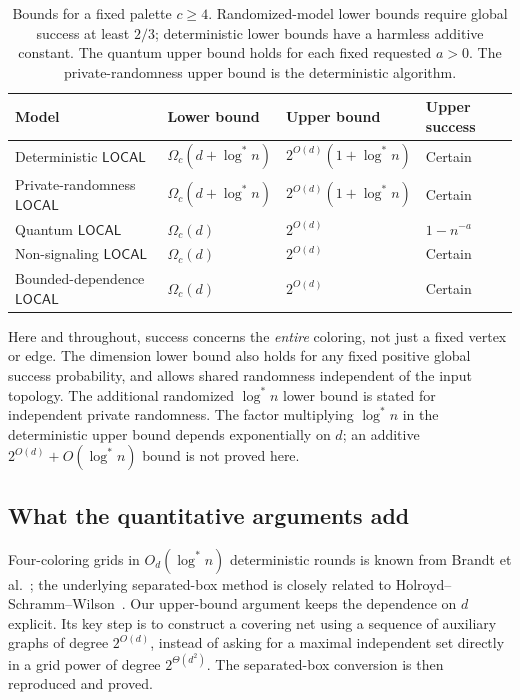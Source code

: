 \documentclass[11pt]{article}
\theoremstyle{definition}\newtheorem{definition}[theorem]{Definition}
\theoremstyle{remark}\newtheorem{remark}[theorem]{Remark}
\newcommand{\LOCAL}{\mathsf{LOCAL}}
\newcommand{\ls}{\log^*}
\begin{document}
\begin{table}[htbp]
\centering\small
\begin{tabularx}{\linewidth}{@{}lXXl@{}}
\toprule
Model & Lower bound & Upper bound & Upper success\\
\midrule
Deterministic $\LOCAL$
 & $\Omega_c(d+\ls n)$ & $2^{O(d)}(1+\ls n)$ & Certain\\
Private-randomness $\LOCAL$
 & $\Omega_c(d+\ls n)$ & $2^{O(d)}(1+\ls n)$ & Certain\\
Quantum $\LOCAL$
 & $\Omega_c(d)$ & $2^{O(d)}$ & $1-n^{-a}$\\
Non-signaling $\LOCAL$
 & $\Omega_c(d)$ & $2^{O(d)}$ & Certain\\
Bounded-dependence $\LOCAL$
 & $\Omega_c(d)$ & $2^{O(d)}$ & Certain\\
\bottomrule
\end{tabularx}
\caption{Bounds for a fixed palette $c\ge4$. Randomized-model lower
bounds require global success at least $2/3$; deterministic lower
bounds have a harmless additive constant. The quantum upper bound
holds for each fixed requested $a>0$. The private-randomness upper
bound is the deterministic algorithm.}
\label{tab:main}
\end{table}

Here and throughout, success concerns the \emph{entire} coloring, not
just a fixed vertex or edge. The dimension lower bound also holds for
any fixed positive global success probability, and allows shared
randomness independent of the input topology. The additional
randomized $\ls n$ lower bound is stated for independent private
randomness. The factor multiplying $\ls n$ in the deterministic
upper bound depends exponentially on $d$; an additive
$2^{O(d)}+O(\ls n)$ bound is not proved here.

\subsection{What the quantitative arguments add}

Four-coloring grids in $O_d(\ls n)$ deterministic rounds is known
from Brandt et al.~\cite{grid}; the underlying separated-box method
is closely related to Holroyd--Schramm--Wilson~\cite{HSW}.
Our upper-bound argument keeps the dependence on $d$ explicit.
Its key step is to construct a covering net using a sequence of
auxiliary graphs of degree $2^{O(d)}$, instead of asking for a maximal
independent set directly in a grid power of degree $2^{\Theta(d^2)}$.
The separated-box conversion is then reproduced and proved.
\end{document}
